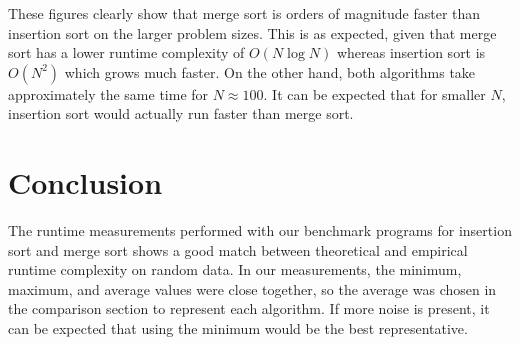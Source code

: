 \documentclass[a4paper,10pt]{article}
\begin{document}
\small\noindent

\normalsize

These figures clearly show that merge sort is orders of magnitude faster than insertion sort on the larger problem sizes.
This is as expected, given that merge sort has a lower runtime complexity of $O(N \log N)$ whereas insertion sort is $O(N^2)$ which grows much faster.
On the other hand, both algorithms take approximately the same time for $N\approx 100$.
It can be expected that for smaller $N$, insertion sort would actually run faster than merge sort.



\section*{Conclusion}

The runtime measurements performed with our benchmark programs for insertion sort and merge sort shows a good match between theoretical and empirical runtime complexity on random data.
In our measurements, the minimum, maximum, and average values were close together, so the average was chosen in the comparison section to represent each algorithm.
If more noise is present, it can be expected that using the minimum would be the best representative.
\end{document}
